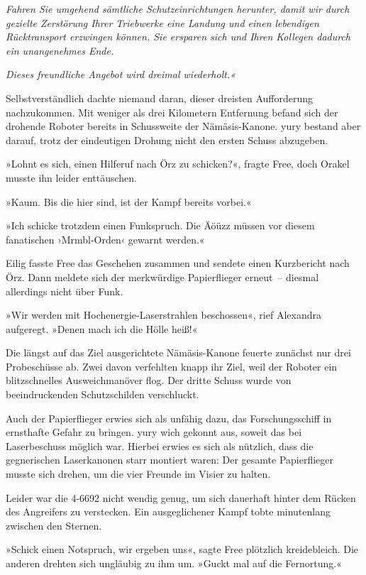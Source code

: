 \textit{Fahren Sie umgehend sämtliche Schutzeinrichtungen herunter, damit wir durch gezielte Zerstörung Ihrer Triebwerke eine Landung und einen lebendigen Rücktransport erzwingen können. Sie ersparen sich und Ihren Kollegen dadurch ein unangenehmes Ende.}

\textit{Dieses freundliche Angebot wird dreimal wiederholt.«}

Selbstverständlich dachte niemand daran, dieser dreisten Aufforderung nachzukommen. Mit weniger als drei Kilometern Entfernung befand sich der drohende Roboter bereits in Schussweite der Nämäsis-Kanone. yury bestand aber darauf, trotz der eindeutigen Drohung nicht den ersten Schuss abzugeben.

»Lohnt es sich, einen Hilferuf nach Örz zu schicken?«, fragte Free, doch Orakel musste ihn leider enttäuschen.

»Kaum. Bis die hier sind, ist der Kampf bereits vorbei.«

»Ich schicke trotzdem einen Funkspruch. Die Äöüzz müssen vor diesem fanatischen ›Mrmbl-Orden‹ gewarnt werden.«

Eilig fasste Free das Geschehen zusammen und sendete einen Kurzbericht nach Örz. Dann meldete sich der merkwürdige Papierflieger erneut~– diesmal allerdings nicht über Funk.

»Wir werden mit Hochenergie-Laserstrahlen beschossen«, rief Alexandra aufgeregt. »Denen mach ich die Hölle heiß!«

Die längst auf das Ziel ausgerichtete Nämäsis-Kanone feuerte zunächst nur drei Probeschüsse ab. Zwei davon verfehlten knapp ihr Ziel, weil der Roboter ein blitzschnelles Ausweichmanöver flog. Der dritte Schuss wurde von beeindruckenden Schutzschilden verschluckt.

Auch der Papierflieger erwies sich als unfähig dazu, das Forschungsschiff in ernsthafte Gefahr zu bringen. yury wich gekonnt aus, soweit das bei Laserbeschuss möglich war. Hierbei erwies es sich als nützlich, dass die gegnerischen Laserkanonen starr montiert waren: Der gesamte Papierflieger musste sich drehen, um die vier Freunde im Visier zu halten.

Leider war die 4-6692 nicht wendig genug, um sich dauerhaft hinter dem Rücken des Angreifers zu verstecken. Ein ausgeglichener Kampf tobte minutenlang zwischen den Sternen.

»Schick einen Notspruch, wir ergeben uns«, sagte Free plötzlich kreidebleich. Die anderen drehten sich ungläubig zu ihm um. »Guckt mal auf die Fernortung.«

